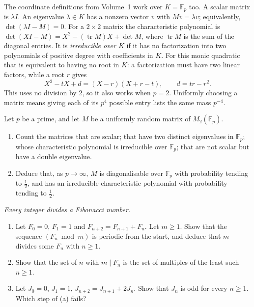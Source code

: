 \begin{reminder}
The coordinate definitions from Volume~1 work over $K=\mathbb F_p$ too.
A scalar matrix is $\lambda I$. An eigenvalue $\lambda\in K$ has a
nonzero vector $v$ with $Mv=\lambda v$; equivalently,
$\det(\lambda I-M)=0$. For a $2\times2$ matrix the characteristic
polynomial is $\det(XI-M)=X^2-(\operatorname{tr}M)X+\det M$, where
$\operatorname{tr}M$ is the sum of the diagonal entries.
It is \emph{irreducible over $K$} if it has no factorization into two
polynomials of positive degree with coefficients in $K$. For this monic
quadratic that is equivalent to having no root in $K$: a factorization
must have two linear factors, while a root $r$ gives
\[
X^2-tX+d=(X-r)(X+r-t),\qquad d=tr-r^2.
\]
This uses no division by $2$, so it also works when $p=2$.
Uniformly choosing a matrix means giving each of its $p^4$ possible
entry lists the same mass $p^{-4}$.
\end{reminder}

\begin{exercise}[$\star\star$]\label{pb:matrices2}
Let $p$ be a prime, and let $M$ be a uniformly random matrix of $M_2(\mathbb F_p)$.
\begin{enumerate}[label=(\alph*)]
\item Count the matrices that are scalar; that have two distinct eigenvalues in $\mathbb F_p$; whose characteristic polynomial
is irreducible over $\mathbb F_p$; that are not scalar but have a double eigenvalue.
\item Deduce that, as $p\to\infty$, $M$ is diagonalisable over $\mathbb F_p$ with probability tending to $\frac12$, and has an
irreducible characteristic polynomial with probability tending to $\frac12$.
\end{enumerate}
\end{exercise}

\begin{exercise}[$\star$]\label{pb:fibdivides}
\emph{Every integer divides a Fibonacci number.}
\begin{enumerate}[label=(\alph*)]
\item Let $F_0=0$, $F_1=1$ and $F_{n+2}=F_{n+1}+F_n$. Let $m\ge1$. Show that the sequence $(F_n\bmod m)$ is periodic from the start, and deduce that $m$ divides some $F_n$ with
$n\ge1$.
\item Show that the set of $n$ with $m\mid F_n$ is the set of multiples of the least such $n\ge1$.
\item Let $J_0=0$, $J_1=1$, $J_{n+2}=J_{n+1}+2J_n$. Show that $J_n$ is odd for every $n\ge1$. Which step of (a) fails?
\end{enumerate}
\end{exercise}

